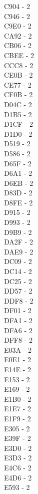\documentclass[10pt,letterpaper]{article}
\begin{document}
C904 -  2\\
C946 -  2\\
C9E0 -  2\\
CA92 -  2\\
CB06 -  2\\
CBEE -  2\\
CCC8 -  2\\
CE0B -  2\\
CE77 -  2\\
CF0B -  2\\
D04C -  2\\
D1B5 -  2\\
D1CF -  2\\
D1D0 -  2\\
D519 -  2\\
D586 -  2\\
D65F -  2\\
D6A1 -  2\\
D6EB -  2\\
D83D -  2\\
D8FE -  2\\
D915 -  2\\
D993 -  2\\
D9B9 -  2\\
DA2F -  2\\
DAE9 -  2\\
DC09 -  2\\
DC14 -  2\\
DC25 -  2\\
DD57 -  2\\
DDF8 -  2\\
DF01 -  2\\
DFA1 -  2\\
DFA6 -  2\\
DFF8 -  2\\
E03A -  2\\
E0E1 -  2\\
E14E -  2\\
E153 -  2\\
E169 -  2\\
E1B0 -  2\\
E1E7 -  2\\
E1F9 -  2\\
E305 -  2\\
E39F -  2\\
E3D0 -  2\\
E3D3 -  2\\
E4C6 -  2\\
E4D6 -  2\\
E593 -  2\\
\end{document}
